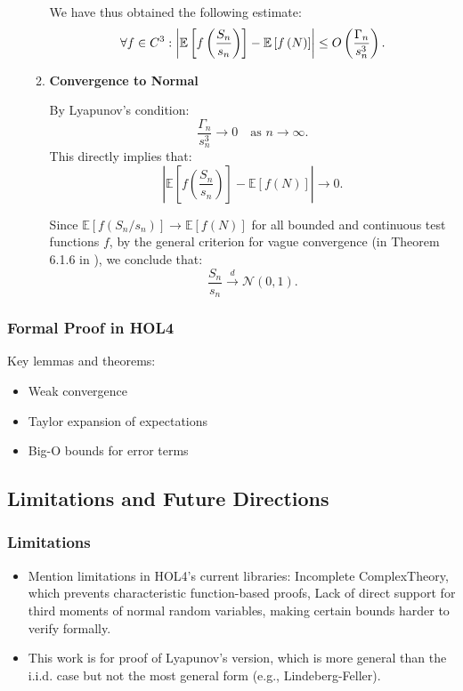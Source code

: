 \begin{itemize}
\begin{enumerate}
We have thus obtained the following estimate:
\[
\forall f \in C^3: \left| \space  \mathbb{E}\left[f\left(\frac{S_n}{s_n}\right)\right] - \mathbb{E}\left[f\left(N\right)\right] \right| \leq O\left(\frac{\Gamma_n}{s_n^3}\right).
\]

\item \textbf{Convergence to Normal}

By Lyapunov's condition:
\[
\frac{\Gamma_n}{s_n^3} \to 0 \quad \text{as } n \to \infty.
\]
This directly implies that:
\[
\left| \mathbb{E}\left[f\left(\frac{S_n}{s_n}\right)\right] - \mathbb{E}\left[f(N)\right] \right| \to 0.
\]

Since \( \mathbb{E}[f(S_n / s_n)] \to \mathbb{E}[f(N)] \) for all bounded and continuous test functions \( f \), by the general criterion for vague convergence (in Theorem 6.1.6 in \cite{chung2000course}), we conclude that:
\[
\frac{S_n}{s_n} \xrightarrow{d} \mathcal{N}(0, 1).
\]

    \end{enumerate}
\end{itemize}

\subsubsection{Formal Proof in HOL4}
Key lemmas and theorems:
\begin{itemize}
    \item Weak convergence
    \item Taylor expansion of expectations
    \item Big-O bounds for error terms
\end{itemize}

\subsection{Limitations and Future Directions}
\subsubsection{Limitations}
\begin{itemize}
    \item Mention limitations in HOL4’s current libraries: Incomplete ComplexTheory, which prevents characteristic function-based proofs, Lack of direct support for third moments of normal random variables, making certain bounds harder to verify formally.
    \item This work is for proof of Lyapunov’s version, which is more general than the i.i.d. case but not the most general form (e.g., Lindeberg-Feller).
\end{itemize}

